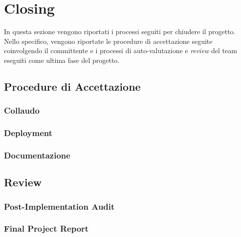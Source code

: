 \section{Closing}
\label{sec:closing}

In questa sezione vengono riportati i processi seguiti per chiudere il progetto. Nello specifico, vengono riportate le procedure di accettazione seguite coinvolgendo il committente e i processi di auto-valutazione e \textit{review} del team eseguiti come ultima fase del progetto.

\subsection{Procedure di Accettazione}

\subsubsection{Collaudo}

\subsubsection{Deployment}

\subsubsection{Documentazione}

\subsection{Review}

\subsubsection{Post-Implementation Audit}

\subsubsection{Final Project Report}